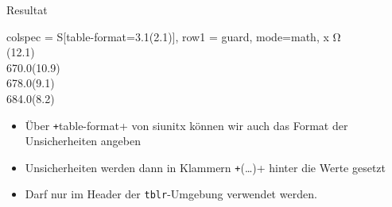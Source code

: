\begin{frame}{Resultat}
  \begin{center}
    \begin{tblr}{
        colspec = {S[table-format=3.1(2.1)]},
        row{1} = {guard, mode=math},
      }
      \toprule
      x \mathbin{/} \unit{\ohm} \\
      (12.1) \\
      670.0(10.9) \\
      678.0(9.1)  \\
      684.0(8.2)  \\
      \bottomrule
    \end{tblr}
  \end{center}
  \vspace{5pt}
  \begin{itemize}
    \item Über \texttt+table-format+ von siunitx können wir auch das Format der Unsicherheiten angeben
    \item Unsicherheiten werden dann in Klammern \texttt+(…)+ hinter die Werte gesetzt
    \item \alert{Darf nur im Header der \texttt{tblr}-Umgebung verwendet werden.}
  \end{itemize}
\end{frame}


